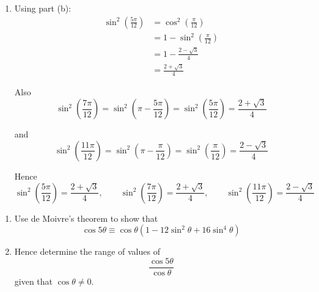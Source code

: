 \documentclass[leqno]{article}
\begin{document}
\begin{enumerate}[
  label=\textbf{\arabic*.},
  leftmargin=*,
  topsep=0pt,
  partopsep=0pt,
  parsep=0pt
]
\begin{djsSolution}
\begin{enumerate}[label=\textbf{(\alph*)}]
or
\begin{align*}
16u^2-16u+1&=0 \\
u&=\frac{16\pm\sqrt{(-16)^2-4(16)(1)}}{2\cdot16} \\
&=\frac{16\pm\sqrt{256-64}}{32} \\
&=\frac{16\pm\sqrt{192}}{32} \\
&=\frac{16\pm8\sqrt3}{32} \\
&=\frac{2\pm\sqrt3}{4}
\end{align*}

Now
\[
\cos\left(6\times\frac{\pi}{12}\right)=\cos\frac{\pi}{2}=0
\]

so \(\sin^2\left(\frac{\pi}{12}\right)\) must be one of
\[
\frac12,\quad \frac{2+\sqrt3}{4},\quad \frac{2-\sqrt3}{4}
\]

But
\[
0<\frac{\pi}{12}<\frac{\pi}{4}
\]

so
\[
\sin^2\left(\frac{\pi}{12}\right)<\sin^2\left(\frac{\pi}{4}\right)=\frac12
\]

Therefore the correct value is
\[
\sin^2\left(\frac{\pi}{12}\right)=\frac{2-\sqrt3}{4}
\]

  \item Using part (b):
\begin{align*}
\sin^2\left(\frac{5\pi}{12}\right)
&=\cos^2\left(\frac{\pi}{12}\right) \\
&=1-\sin^2\left(\frac{\pi}{12}\right) \\
&=1-\frac{2-\sqrt3}{4} \\
&=\frac{2+\sqrt3}{4}
\end{align*}

Also
\[
\sin^2\left(\frac{7\pi}{12}\right)=\sin^2\left(\pi-\frac{5\pi}{12}\right)=\sin^2\left(\frac{5\pi}{12}\right)=\frac{2+\sqrt3}{4}
\]

and
\[
\sin^2\left(\frac{11\pi}{12}\right)=\sin^2\left(\pi-\frac{\pi}{12}\right)=\sin^2\left(\frac{\pi}{12}\right)=\frac{2-\sqrt3}{4}
\]

Hence
\[
\sin^2\left(\frac{5\pi}{12}\right)=\frac{2+\sqrt3}{4},\qquad
\sin^2\left(\frac{7\pi}{12}\right)=\frac{2+\sqrt3}{4},\qquad
\sin^2\left(\frac{11\pi}{12}\right)=\frac{2-\sqrt3}{4}
\]
\end{enumerate}
\end{djsSolution}


\newpage

\questionitem

\begin{enumerate}[label=\textbf{(\roman*)}]
  \item Use de Moivre's theorem to show that
  \[
  \cos 5\theta \equiv \cos \theta \left(1 - 12\sin^2 \theta + 16\sin^4 \theta\right)
  \]
  \item Hence determine the range of values of
  \[
  \frac{\cos 5\theta}{\cos \theta}
  \]
  given that $\cos \theta \ne 0$.  \\
\end{enumerate}


\end{enumerate}
\end{document}
